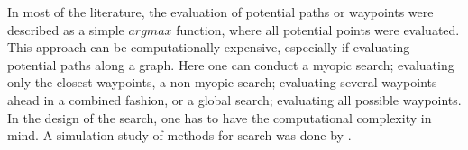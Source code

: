 In most of the literature, the evaluation of potential paths or waypoints were described as a simple $argmax$ function, where all potential points were evaluated. This approach can be computationally expensive, especially if evaluating potential paths along a graph. Here one can conduct a myopic search; evaluating only the closest waypoints, a non-myopic search; evaluating several waypoints ahead in a combined fashion, or a global search; evaluating all possible waypoints. In the design of the search, one has to have the computational complexity in mind. A simulation study of methods for search was done by \textcite{fossum2021learning}.

